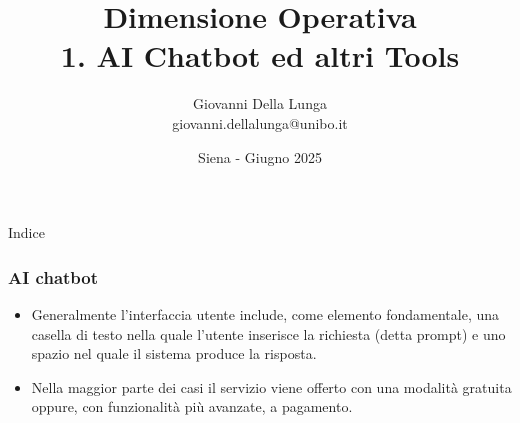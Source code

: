 \documentclass[aspectratio=169]{beamer}
\title{Dimensione Operativa \\ 1. AI Chatbot ed altri Tools}
\subtitle{}
\author{Giovanni Della Lunga\\{\footnotesize giovanni.dellalunga@unibo.it}}
\institute{A lezione di Intelligenza Artificiale}
\date{Siena - Giugno 2025}
\begin{document}
\begin{frame}
    \titlepage
\end{frame}

\begin{frame}{Indice}
    \tableofcontents
\end{frame}
%
%
\AtBeginSubsection{\frame{\subsectionpage}}
%
%
\begin{frame}
\frametitle{AI chatbot}
\begin{itemize}
    \item Generalmente l’interfaccia utente include, come elemento fondamentale, una casella di testo nella quale l’utente inserisce la richiesta (detta prompt) e uno spazio nel quale il sistema produce la risposta.
    \item Nella maggior parte dei casi il servizio viene offerto con una modalità gratuita oppure, con funzionalità più avanzate, a pagamento.
\end{itemize}
\end{frame}
%
\end{document}
